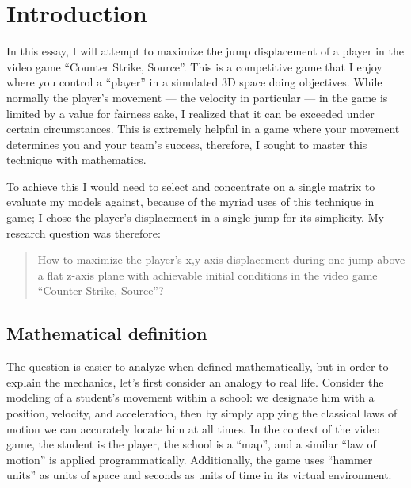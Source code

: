 \section{Introduction}


In this essay, I will attempt to maximize the jump displacement of a player in the video game ``Counter Strike, Source''. This is a competitive game that I enjoy where you control a ``player'' in a simulated 3D space doing objectives. While normally the player's movement --- the velocity in particular --- in the game is limited by a value for fairness sake, I realized that it can be exceeded under certain circumstances. This is extremely helpful in a game where your movement determines you and your team's success, therefore, I sought to master this technique with mathematics.


To achieve this I would need to select and concentrate on a single matrix to evaluate my models against, because of the myriad uses of this technique in game; I chose the player's displacement in a single jump for its simplicity. My research question was therefore:
\begin{quote}
    How to maximize the player's x,y-axis displacement during one jump above a flat z-axis plane with achievable initial conditions in the video game ``Counter Strike, Source''?
\end{quote}

\subsection{Mathematical definition}
The question is easier to analyze when defined mathematically, but in order to explain the mechanics, let's first consider an analogy to real life. Consider the modeling of a student's movement within a school: we designate him with a position, velocity, and acceleration, then by simply applying the classical laws of motion we can accurately locate him at all times. In the context of the video game, the student is the player, the school is a ``map'', and a similar ``law of motion'' is applied programmatically. Additionally, the game uses ``hammer units'' as units of space and seconds as units of time in its virtual environment.



